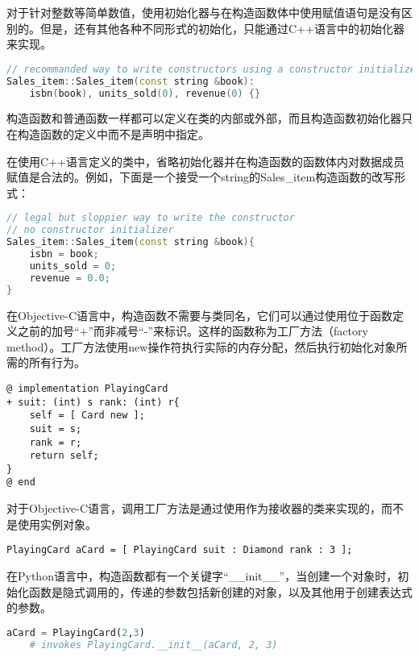 对于针对整数等简单数值，使用初始化器与在构造函数体中使用赋值语句是没有区别的。但是，还有其他各种不同形式的初始化，只能通过C++语言中的初始化器来实现。


\begin{lstlisting}[language=C++]
// recommanded way to write constructors using a constructor initializer
Sales_item::Sales_item(const string &book):
	isbn(book), units_sold(0), revenue(0) {}
\end{lstlisting}

构造函数和普通函数一样都可以定义在类的内部或外部，而且构造函数初始化器只在构造函数的定义中而不是声明中指定。

在使用C++语言定义的类中，省略初始化器并在构造函数的函数体内对数据成员赋值是合法的。例如，下面是一个接受一个string的Sales\_item构造函数的改写形式：

\begin{lstlisting}[language=C++]
// legal but sloppier way to write the constructor
// no constructor initializer
Sales_item::Sales_item(const string &book){
	isbn = book;
	units_sold = 0;
	revenue = 0.0;
}
\end{lstlisting}



在Objective-C语言中，构造函数不需要与类同名，它们可以通过使用位于函数定义之前的加号“+”而非减号“-”来标识。这样的函数称为工厂方法（factory method）。工厂方法使用new操作符执行实际的内存分配，然后执行初始化对象所需的所有行为。

\begin{lstlisting}[language={[Objective]C}]
@ implementation PlayingCard
+ suit: (int) s rank: (int) r{
	self = [ Card new ];
	suit = s;
	rank = r;
	return self;
} 
@ end
\end{lstlisting}

对于Objective-C语言，调用工厂方法是通过使用作为接收器的类来实现的，而不是使用实例对象。

\begin{lstlisting}[language={[Objective]C}]
PlayingCard aCard = [ PlayingCard suit : Diamond rank : 3 ];
\end{lstlisting}

在Python语言中，构造函数都有一个关键字“\_\_init\_\_”，当创建一个对象时，初始化函数是隐式调用的，传递的参数包括新创建的对象，以及其他用于创建表达式的参数。

\begin{lstlisting}[language=Python]
aCard = PlayingCard(2,3)
	# invokes PlayingCard.__init__(aCard, 2, 3)
\end{lstlisting}

